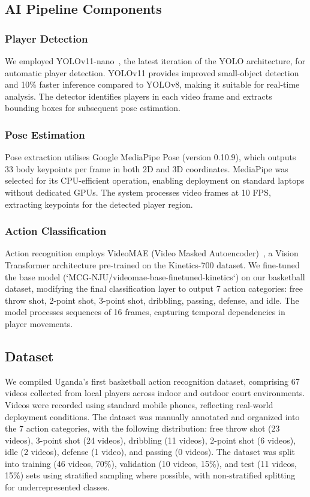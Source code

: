 \documentclass[conference]{IEEEtran}
\begin{document}
\subsection{AI Pipeline Components}

\subsubsection{Player Detection}
We employed YOLOv11-nano~\cite{ultralytics2024}, the latest iteration of the YOLO architecture, for automatic player detection. YOLOv11 provides improved small-object detection and 10\% faster inference compared to YOLOv8, making it suitable for real-time analysis. The detector identifies players in each video frame and extracts bounding boxes for subsequent pose estimation.

\subsubsection{Pose Estimation}
Pose extraction utilises Google MediaPipe Pose (version 0.10.9), which outputs 33 body keypoints per frame in both 2D and 3D coordinates. MediaPipe was selected for its CPU-efficient operation, enabling deployment on standard laptops without dedicated GPUs. The system processes video frames at 10 FPS, extracting keypoints for the detected player region.

\subsubsection{Action Classification}
Action recognition employs VideoMAE (Video Masked Autoencoder)~\cite{videomae2022}, a Vision Transformer architecture pre-trained on the Kinetics-700 dataset. We fine-tuned the base model (`MCG-NJU/videomae-base-finetuned-kinetics`) on our basketball dataset, modifying the final classification layer to output 7 action categories: free throw shot, 2-point shot, 3-point shot, dribbling, passing, defense, and idle. The model processes sequences of 16 frames, capturing temporal dependencies in player movements.

\subsection{Dataset}
We compiled Uganda's first basketball action recognition dataset, comprising 67 videos collected from local players across indoor and outdoor court environments. Videos were recorded using standard mobile phones, reflecting real-world deployment conditions. The dataset was manually annotated and organized into the 7 action categories, with the following distribution: free throw shot (23 videos), 3-point shot (24 videos), dribbling (11 videos), 2-point shot (6 videos), idle (2 videos), defense (1 video), and passing (0 videos). The dataset was split into training (46 videos, 70\%), validation (10 videos, 15\%), and test (11 videos, 15\%) sets using stratified sampling where possible, with non-stratified splitting for underrepresented classes.
\end{document}

